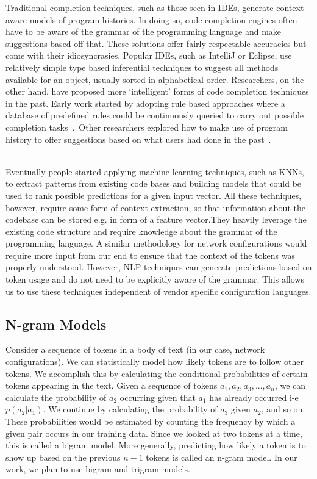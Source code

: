 Traditional completion techniques, such as those seen in IDEs, generate context aware models of program histories. In doing so, code completion engines often have to be aware of the grammar of the programming language and make suggestions based off that. These solutions offer fairly respectable accuracies but come with their idiosyncrasies. Popular IDEs, such as IntelliJ or Eclipse, use relatively simple type based inferential techniques to suggest all methods available for an object, usually sorted in alphabetical order. Researchers, on the other hand, have proposed more ‘intelligent’ forms of code completion techniques in the past. Early work started by adopting rule based approaches where a database of predefined rules could be continuously queried to carry out possible completion tasks~\cite{kaiser}.  Other researchers explored how to make use of program history to offer suggestions based on what users had done in the past~\cite{robbes}.\\  

Eventually people started applying machine learning techniques, such as KNNs, to extract patterns from existing code bases and building models that could be used to rank possible predictions for a given input vector. All these techniques, however, require some form of context extraction, so that information about the codebase can be stored e.g. in form of a feature vector.They heavily leverage the existing code structure and require knowledge about the grammar of the programming language. A similar methodology for network configurations would require more input from our end to ensure that the context of the tokens was properly understood. However, NLP techniques can generate predictions based on token usage and do not need to be explicitly aware of the grammar. This allows us to use these techniques independent of vendor specific configuration languages. 

\subsection{N-gram Models}

Consider a sequence of tokens in a body of text (in our case, network configurations). We can statistically model how likely tokens are to follow other tokens. We accomplish this by calculating the conditional probabilities of certain tokens appearing in the text. Given a sequence of tokens $a_1,a_2,a_3,...,a_n$, we can calculate the probability of $a_2$ occurring given that $a_1$ has already occurred i-e $p(a_2 | a_1)$. We continue by calculating the probability of $a_3$ given $a_2$, and so on. These probabilities would be estimated by counting the frequency by which a given pair occurs in our training data. Since we looked at two tokens at a time, this is called a bigram model. More generally, predicting how likely a token is to show up based on the previous $n-1$ tokens is called an n-gram model. In our work, we plan to use bigram and trigram models.

